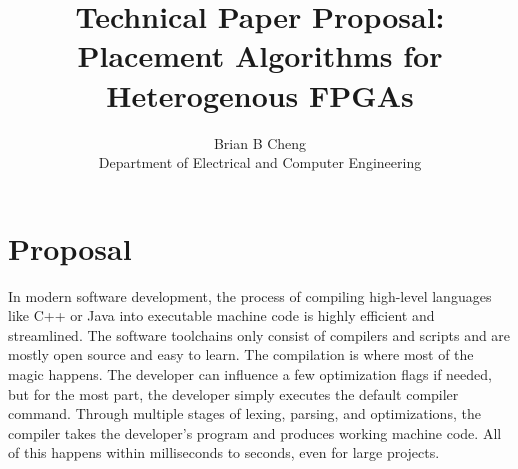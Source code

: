 \documentclass{article}
\begin{document}
\title{Technical Paper Proposal: \\ Placement Algorithms for Heterogenous FPGAs}
\author{Brian B Cheng \\ Department of Electrical and Computer Engineering}


\date{}
\maketitle

\section{Proposal}


In modern software development, the process of compiling high-level languages like C++ or Java into executable machine code is highly efficient and streamlined. 
The software toolchains only consist of compilers and scripts and are mostly open source and easy to learn. 
The compilation is where most of the magic happens. The developer can influence a few optimization flags if needed, but for the most part, the developer simply executes the default compiler command. Through multiple stages of lexing, parsing, and optimizations, the compiler takes the developer's program and produces working machine code. All of this happens within milliseconds to seconds, even for large projects. 
\end{document}
